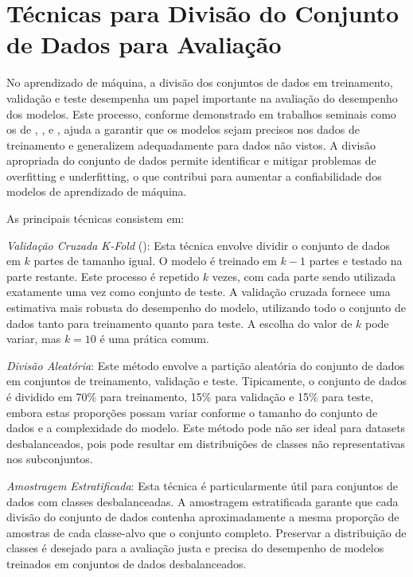 \section{Técnicas para Divisão do Conjunto de Dados para Avaliação}

No aprendizado de máquina, a divisão dos conjuntos de dados em treinamento, validação e teste desempenha um papel importante na avaliação do desempenho dos modelos. Este processo, conforme demonstrado em trabalhos seminais como os de \cite{kohavi1995study}, \cite{Breiman1984}, e \cite{hastie2009elements}, ajuda a garantir que os modelos sejam precisos nos dados de treinamento e generalizem adequadamente para dados não vistos. A divisão apropriada do conjunto de dados permite identificar e mitigar problemas de overfitting e underfitting, o que contribui para aumentar a confiabilidade dos modelos de aprendizado de máquina.

As principais técnicas consistem em:

\textit{Validação Cruzada K-Fold} (\cite{kohavi1995study}): Esta técnica envolve dividir o conjunto de dados em \(k\) partes de tamanho igual. O modelo é treinado em \(k-1\) partes e testado na parte restante. Este processo é repetido \(k\) vezes, com cada parte sendo utilizada exatamente uma vez como conjunto de teste. A validação cruzada fornece uma estimativa mais robusta do desempenho do modelo, utilizando todo o conjunto de dados tanto para treinamento quanto para teste. A escolha do valor de \(k\) pode variar, mas \(k = 10\) é uma prática comum.

\textit{Divisão Aleatória}: Este método envolve a partição aleatória do conjunto de dados em conjuntos de treinamento, validação e teste. Tipicamente, o conjunto de dados é dividido em 70\% para treinamento, 15\% para validação e 15\% para teste, embora estas proporções possam variar conforme o tamanho do conjunto de dados e a complexidade do modelo. Este método pode não ser ideal para datasets desbalanceados, pois pode resultar em distribuições de classes não representativas nos subconjuntos.

\textit{Amostragem Estratificada}: Esta técnica é particularmente útil para conjuntos de dados com classes desbalanceadas. A amostragem estratificada garante que cada divisão do conjunto de dados contenha aproximadamente a mesma proporção de amostras de cada classe-alvo que o conjunto completo. Preservar a distribuição de classes é desejado para a avaliação justa e precisa do desempenho de modelos treinados em conjuntos de dados desbalanceados.

